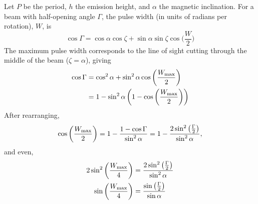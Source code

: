 \documentclass{book}
\begin{document}
Let $P$ be the period, $h$ the emission height, and $\alpha$ the magnetic inclination.
For a beam with half-opening angle $\Gamma$, the pulse width (in units of radians per rotation), $W$, is \citep[from spherical geometry, cf.][, Eq. (3.26)]{lorimer2005handbook}
\begin{equation}
  \cos\Gamma
    = \cos\alpha \cos\zeta + \sin\alpha \sin\zeta \cos\bigg(\frac{W}{2}\bigg) 
\end{equation}
The maximum pulse width corresponds to the line of sight cutting through the middle of the beam ($\zeta = \alpha$), giving
\begin{equation}
  \begin{aligned}
    \cos\Gamma
      &= \cos^2\alpha + \sin^2\alpha \cos\bigg(\frac{W_{\rm max}}{2}\bigg) \\
      &= 1 - \sin^2\alpha \left( 1 - \cos\bigg(\frac{W_{\rm max}}{2}\bigg) \right)
  \end{aligned}
  \label{eqn:los_middle_cut}
\end{equation}
After rearranging,
\begin{equation}
  \cos\bigg(\frac{W_{\rm max}}{2}\bigg)
    = 1 - \frac{1 - \cos\Gamma}{\sin^2\alpha}
    = 1 - \frac{2 \sin^2\left(\frac{\Gamma}{2}\right)}{\sin^2\alpha},
  \label{eqn:width-beam-relation} 
\end{equation}
and even,
\begin{equation}
  \begin{aligned}
  2\sin^2\bigg(\frac{W_{\rm max}}{4}\bigg)
    &= \frac{2 \sin^2\left(\frac{\Gamma}{2}\right)}{\sin^2\alpha} \\
  \sin\bigg(\frac{W_{\rm max}}{4}\bigg)
    &= \frac{\sin\left(\frac{\Gamma}{2}\right)}{\sin\alpha}
  \end{aligned}
\end{equation}
\end{document}

